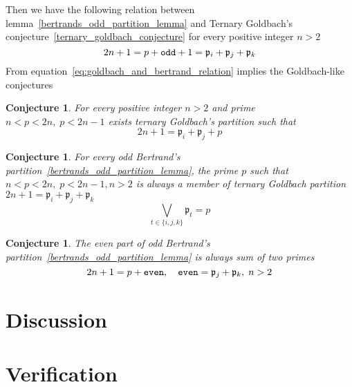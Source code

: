 \documentclass[12pt,letterpaper,oneside,reqno]{amsart}
\newtheorem{conj}[thm]{Conjecture}
\begin{document}
    Then we have the following relation between lemma~\ref{bertrands_odd_partition_lemma} and
    Ternary Goldbach's conjecture~\ref{ternary_goldbach_conjecture} for every positive integer $n>2$
    \begin{equation}
        2n + 1 = p + \verb!odd! + 1 = \mathfrak{p}_i +  \mathfrak{p}_j + \mathfrak{p}_k
        \label{eq:goldbach_and_bertrand_relation}
    \end{equation}
    From equation~\eqref{eq:goldbach_and_bertrand_relation} implies the Goldbach-like conjectures
    \begin{conj}
        For every positive integer $n>2$ and prime $n < p< 2n, \; p<2n-1$
        exists ternary Goldbach's partition such that
        \[
            2n+1 = \mathfrak{p}_i +  \mathfrak{p}_j + p
        \]
    \end{conj}
    \begin{conj}
        For every odd Bertrand's partition~\ref{bertrands_odd_partition_lemma}, the prime $p$ such that $n < p <2n, \; p < 2n-1, n > 2$ is always a member of
        ternary Goldbach partition $2n+1 =\mathfrak{p}_i +  \mathfrak{p}_j + \mathfrak{p}_k$
        \[
            \bigvee_{t \in \{i, j, k\}} \mathfrak{p}_t = p
        \]
    \end{conj}
    \begin{conj}
        The even part of odd Bertrand's partition~\ref{bertrands_odd_partition_lemma}
        is always sum of two primes
        \[
            2n + 1 = p + \verb!even!, \quad \verb!even! = \mathfrak{p}_j + \mathfrak{p}_k, \; n > 2
        \]
    \end{conj}


    \section{Discussion}\label{sec:discussion}
    \section{Verification}\label{sec:verification}
    
    
\end{document}
